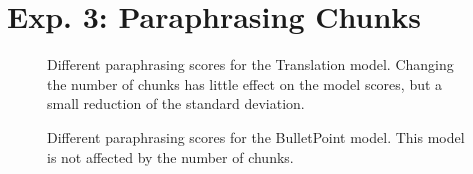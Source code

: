 \section{Exp. 3: Paraphrasing Chunks}
\label{sec:app_chunks}

\begin{figure}[htbp]
    \centering
    
    \caption{Different paraphrasing scores for the Translation model. 
    Changing the number of chunks has little effect on the model scores, but a small reduction of the standard deviation.}
    \label{fig:abl_chunks_gutenberg_translation}
\end{figure}

\begin{figure}[htbp]
    \centering
    
    \caption{Different paraphrasing scores for the BulletPoint model. 
    This model is not affected by the number of chunks.}
    \label{fig:abl_chunks_student_essays_task}
\end{figure}